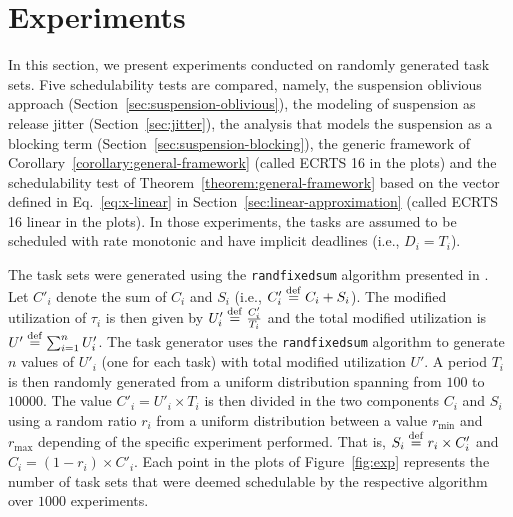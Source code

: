 \section{Experiments}
\label{sec:experiments}

In this section, we present experiments conducted on randomly generated task sets. Five schedulability tests are compared, namely, the suspension oblivious approach (Section~\ref{sec:suspension-oblivious}), the modeling of suspension as release jitter (Section~\ref{sec:jitter}), the analysis that models the suspension as a blocking term (Section~\ref{sec:suspension-blocking}), the generic framework of Corollary~\ref{corollary:general-framework} (called ECRTS 16 in the plots) and the schedulability test of Theorem~\ref{theorem:general-framework} based on the vector defined in Eq.~\eqref{eq:x-linear} in Section~\ref{sec:linear-approximation} (called ECRTS 16 linear in the plots). In those experiments, the tasks are assumed to be scheduled with rate monotonic and have implicit deadlines (i.e., $D_i = T_i$).

The task sets were generated using the \texttt{randfixedsum} algorithm presented in \cite{Emberson-taskSetGeneration-2010}. Let $C'_i$ denote the sum of $C_i$ and $S_i$ (i.e., $C'_i \stackrel{\mathrm{def}}{=} C_i + S_i$). 
The modified utilization of $\tau_i$ is then given by $U'_i \stackrel{\mathrm{def}}{=} \frac{C'_i}{T_i}$ and the total modified utilization is $U' \stackrel{\mathrm{def}}{=} \sum_{i=1}^n U'_i$. The task generator uses the \texttt{randfixedsum} algorithm to generate $n$ values of $U'_i$ (one for each task) with total modified utilization $U'$. A period $T_i$ is then randomly generated from a uniform distribution spanning from $100$ to $10000$. The value $C'_i = U'_i \times T_i$ is then divided in the two components $C_i$ and $S_i$ using a random ratio $r_i$ from a uniform distribution between a value $r_{\min}$ and $r_{\max}$ depending of the specific experiment performed. That is, $S_i \stackrel{\mathrm{def}}{=} r_i \times C'_i$ and $C_i = (1 - r_i) \times C'_i$. 
Each point in the plots of Figure~\ref{fig:exp} represents the number of task sets that were deemed schedulable by the respective algorithm over $1000$ experiments.

